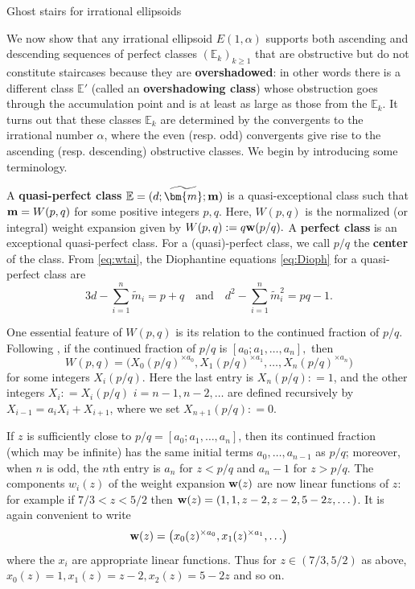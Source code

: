 \documentclass[11pt, reqno]{amsart}
\makeatletter
\def\subsection{\@startsection{subsection}{2}%
  \z@{.75\linespacing\@plus.7\linespacing}{-.5em}%
  {\normalfont\large\bfseries}}
\theoremstyle{remark}
\numberwithin{equation}{subsection}
\numberwithin{figure}{section}
\theoremstyle{customremark}
\newcommand{\bw}{{\bf w}}
\newcommand{\Tm}{{\widetilde m}}
\newcommand{\bE}{{\mathbb E}}
\newcommand{\al}{{\alpha}}
\newcommand{\btm}{\widetilde{\bm{m}}}
\makeatother
\begin{document}
\subsection{Ghost stairs for irrational ellipsoids}\label{ss:ghost}


We now show that any irrational ellipsoid $E(1,\al)$ supports both ascending and descending sequences of perfect classes $(\bE_k)_{k\ge 1}$ that are obstructive but do not constitute staircases because they are {\bf overshadowed}: in other words there is a different class $\bE'$ (called an {\bf overshadowing class}) whose obstruction goes through the accumulation point and is at least as large as those from the $\bE_k$.
It turns out that these classes $\bE_k$ are determined by the  convergents to the irrational number $\al$, where the even (resp. odd) convergents give rise to the ascending (resp. descending) obstructive classes.
We begin by introducing some terminology.

A {\bf quasi-perfect class} $\bE=(d;\btm;{\bf m})$ is a quasi-exceptional class such that ${\bf m}=W(p,q)$ for some positive integers $p,q$. Here, $W(p,q)$ is the normalized (or integral)  weight expansion given by $W(p,q):=q\bw(p/q).$ A {\bf perfect class} is an exceptional quasi-perfect class. For a (quasi)-perfect class, we call $p/q$ the {\bf center} of the class. From \eqref{eq:wtai}, the Diophantine equations \eqref{eq:Dioph} for a quasi-perfect class are 
\begin{equation} \label{eq:DiophPerfect}
    3d-\sum_{i=1}^n \Tm_i=p+q \quad \text{and} \quad d^2-\sum_{i=1}^n \Tm_i^2=pq-1.
\end{equation} 

One essential feature of $W(p,q)$ is its relation to the continued fraction of $p/q.$ Following \cite[Section 2.2]{ball}, if the continued fraction of $p/q$ is $[a_0;a_1,\hdots,a_n],$ then 
\[ W(p,q)=\bigl(X_0(p/q)^{\times a_0},X_1(p/q)^{\times a_1},\hdots,X_n(p/q)^{\times a_n}\bigr)
\]
for some integers $X_i(p/q).$ Here the last entry is $X_n(p/q): =  1$, and the other integers $X_i : = X_i(p/q)$ $i = n-1, n-2,\dots$  are defined  recursively by
$X_{i-1} = a_i X_i + X_{i+1}$, where we set  $X_{n+1}(p/q): = 0$.  

 If $z$ is sufficiently close to $p/q =  [a_0;a_1,\hdots, a_n]$, then its continued fraction (which may be infinite) has the same initial terms
$a_0,\dots, a_{n-1}$ as $p/q$; moreover, when $n$ is odd, the $n$th entry is $a_{n}$ for $z< p/q$ and $a_{n} - 1$ for $z> p/q$.
The components $w_i(z)$ of the weight expansion $\bw(z)$ are now  linear functions of  $z$: for example if $7/3 < z < 5/2$ then 
$\bw(z) = (1,1,z-2, z-2,5 - 2z,\dots)$.  It is again convenient to write
\[ \bw(z)=\bigl(x_0(z)^{\times a_0},x_1(z)^{\times a_1},\hdots\bigr)\]
where the $x_i$ are appropriate linear functions. Thus for $z\in (7/3, 5/2)$ as above, $x_0(z) = 1, x_1(z) = z-2, x_2(z) = 5-2z$ and so on.
\end{document}
